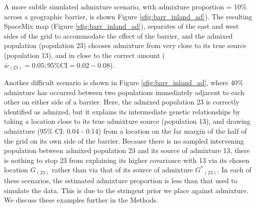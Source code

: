 \documentclass[12pt]{article}
\newcommand{\identifyadmixsource}[1]{{#1^{*}}}
\begin{document}
A more subtle simulated admixture scenario, with admixture proportion = 10\% across a geographic barrier, 
is shown Figure  \ref{sfig:barr_inland_ad}).  
The resulting SpaceMix map (Figure  \ref{sfig:barr_inland_ad}), 
separates of the east and west sides of the grid to accommodate the effect of the barrier,
and the admixed population (population 23) chooses admixture from very close to its true source (population 13), 
and in close to the correct amount ($\bar{w}_{(23)} = 0.05; 95\% \text{CI} = 0.02-0.08$).

Another difficult scenario is shown in Figure \ref{sfig:barr_inland_ad},
where 40\% admixture has occurred between two populations immediately adjacent to each other on either side of a barrier.  
Here, the admixed population 23 is correctly identified as admixed, 
but it explains its intermediate genetic relationships by taking a location close to its true admixture source (population 13), 
and drawing admixture (95\% CI: 0.04 - 0.14) from a location on the far margin of the half of the grid on its own side of the barrier.
Because there is no sampled intervening population between admixed population 23 and its source of admixture 13, there is nothing to stop 23 from explaining its higher covariance with 13 via its chosen location $G_{(23)}$ rather than via that of its source of admixture $\identifyadmixsource{G}_{(23)}$.  
In each of these scenarios, the estimated admixture proportion is less than that used to simulate the data.  This is due to the stringent prior we place against admixture.  We discuss these examples further in the Methods.
\end{document}
